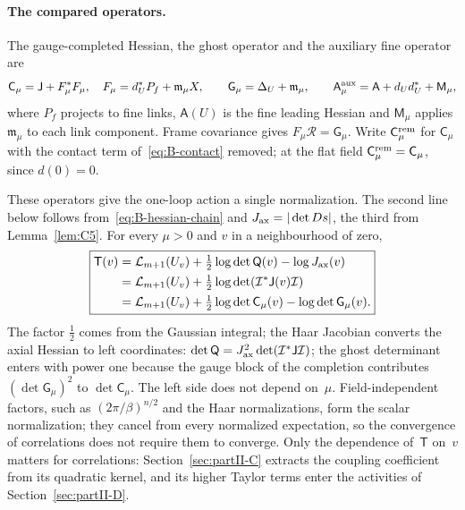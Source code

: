 \paragraph{The compared operators.} The gauge-completed Hessian, the ghost operator and the auxiliary fine operator are
\begin{equation*}
\mathsf C_\mu=\mathsf J+F_\mu^*F_\mu,\quad F_\mu=d_U^*P_f+\mathfrak m_\mu X,\qquad
\mathsf G_\mu=\Delta_U+\mathfrak m_\mu,\qquad
\mathsf A^{\rm aux}_\mu=\mathsf A+d_Ud_U^*+\mathsf M_\mu ,
\end{equation*}
where $P_f$ projects to fine links, $\mathsf A(U)$ is the fine leading Hessian and $\mathsf M_\mu$ applies $\mathfrak m_\mu$ to each link component. Frame covariance gives $F_\mu\mathcal R=\mathsf G_\mu$. Write $\mathsf C^{\rm rem}_\mu$ for $\mathsf C_\mu$ with the contact term of~\eqref{eq:B-contact} removed; at the flat field $\mathsf C^{\rm rem}_\mu=\mathsf C_\mu$, since $d(0)=0$.

These operators give the one-loop action a single normalization. The second line below follows from~\eqref{eq:B-hessian-chain} and $J_{\rm ax}=|\det Ds|$, the third from Lemma~\ref{lem:C5}. For every $\mu>0$ and $v$ in a neighbourhood of zero,
\begin{equation}\label{eq:B-one-loop-box}
\boxed{\begin{aligned}
\mathsf T(v)&=\mathcal L_{m+1}(U_v)+\tfrac12\log\det\mathsf Q(v)-\log J_{\rm ax}(v)\\
&=\mathcal L_{m+1}(U_v)+\tfrac12\log\det(\mathcal I^*\mathsf J(v)\mathcal I)\\
&=\mathcal L_{m+1}(U_v)+\tfrac12\log\det\mathsf C_\mu(v)-\log\det\mathsf G_\mu(v).
\end{aligned}}
\end{equation}
The factor $\tfrac12$ comes from the Gaussian integral; the Haar Jacobian converts the axial Hessian to left coordinates: $\det\mathsf Q=J_{\rm ax}^2\det(\mathcal I^*\mathsf J\mathcal I)$; the ghost determinant enters with power one because the gauge block of the completion contributes $(\det\mathsf G_\mu)^2$ to $\det\mathsf C_\mu$. The left side does not depend on~$\mu$. Field-independent factors, such as $(2\pi/\beta)^{n/2}$ and the Haar normalizations, form the scalar normalization; they cancel from every normalized expectation, so the convergence of correlations does not require them to converge. Only the dependence of~$\mathsf T$ on~$v$ matters for correlations: Section~\ref{sec:partII-C} extracts the coupling coefficient from its quadratic kernel, and its higher Taylor terms enter the activities of Section~\ref{sec:partII-D}.


